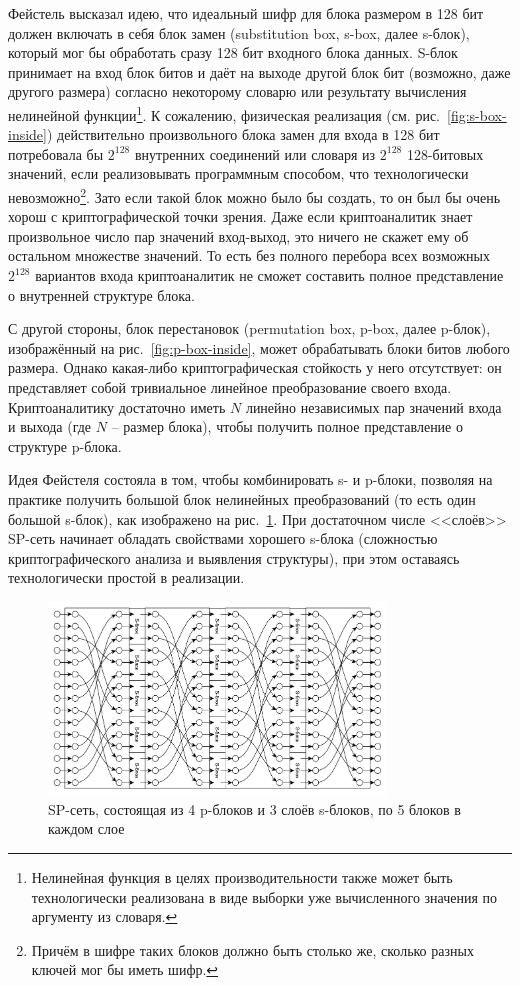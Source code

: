 Фейстель высказал идею, что идеальный шифр для блока размером в 128 бит должен включать в себя блок замен (substitution box, s-box, далее s-блок), который мог бы обработать сразу 128 бит входного блока данных. S-блок принимает на вход блок битов и даёт на выходе другой блок бит (возможно, даже другого размера) согласно некоторому словарю или результату вычисления нелинейной функции\footnote{Нелинейная функция в целях производительности также может быть технологически реализована в виде выборки уже вычисленного значения по аргументу из словаря.}. К сожалению, физическая реализация (см. рис.~\ref{fig:s-box-inside}) действительно произвольного блока замен для входа в 128 бит потребовала бы $2^{128}$ внутренних соединений или словаря из $2^{128}$ 128-битовых значений, если реализовывать программным способом, что технологически невозможно\footnote{Причём в шифре таких блоков должно быть столько же, сколько разных ключей мог бы иметь шифр.}. Зато если такой блок можно было бы создать, то он был бы очень хорош с криптографической точки зрения. Даже если криптоаналитик знает произвольное число пар значений вход-выход, это ничего не скажет ему об остальном множестве значений. То есть без полного перебора всех возможных $2^{128}$ вариантов входа криптоаналитик не сможет составить полное представление о внутренней структуре блока.

С другой стороны, блок перестановок (permutation box, p-box, далее p-блок), изображённый на рис.~\ref{fig:p-box-inside}, может обрабатывать блоки битов любого размера. Однако какая-либо криптографическая стойкость у него отсутствует: он представляет собой тривиальное линейное преобразование своего входа. Криптоаналитику достаточно иметь $N$ линейно независимых пар значений входа и выхода (где $N$ -- размер блока), чтобы получить полное представление о структуре p-блока.

Идея Фейстеля состояла в том, чтобы комбинировать s- и p-блоки, позволяя на практике получить большой блок нелинейных преобразований (то есть один большой s-блок), как изображено на рис.~\ref{fig:sp-network}. При достаточном числе <<слоёв>> SP-сеть начинает обладать свойствами хорошего s-блока (сложностью криптографического анализа и выявления структуры), при этом оставаясь технологически простой в реализации.

\begin{figure}[htb]
	\centering
	\includegraphics[width=0.8\textwidth]{pic/sp-network}
  \caption{SP-сеть, состоящая из 4 p-блоков и 3 слоёв s-блоков, по 5 блоков в каждом слое}
  \label{fig:sp-network}
\end{figure}

